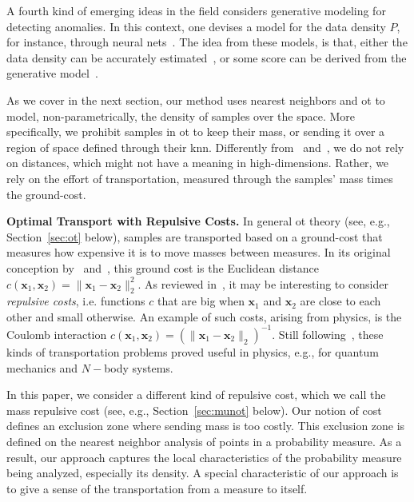 A fourth kind of emerging ideas in the field considers generative modeling for detecting anomalies. In this context, one devises a model for the data density $P$, for instance, through neural nets~\cite{goodfellow2014generative,kingma2013auto}. The idea from these models, is that, either the data density can be accurately estimated~\citep{dias2020anomaly}, or some score can be derived from the generative model~\citep{livernoche2023diffusion}.

As we cover in the next section, our method uses nearest neighbors and \gls{ot} to model, non-parametrically, the density of samples over the space. More specifically, we prohibit samples in \gls{ot} to keep their mass, or sending it over a region of space defined through their \gls{knn}. Differently from~\cite{ramaswamy2000efficient} and~\cite{breunig2000lof}, we do not rely on distances, which might not have a meaning in high-dimensions. Rather, we rely on the effort of transportation, measured through the samples' mass times the ground-cost.

\noindent\textbf{Optimal Transport with Repulsive Costs.} In general \gls{ot} theory (see, e.g., Section~\ref{sec:ot} below), samples are transported based on a ground-cost that measures how expensive it is to move masses between measures. In its original conception by~\cite{monge1781memoire} and~\cite{kantorovich1942transfer}, this ground cost is the Euclidean distance $c(\mathbf{x}_{1}, \mathbf{x}_{2}) = \lVert \mathbf{x}_{1} - \mathbf{x}_{2} \rVert_{2}^{2}$. As reviewed in~\cite{di2017optimal}, it may be interesting to consider \emph{repulsive costs}, i.e. functions $c$ that are big when $\mathbf{x}_{1}$ and $\mathbf{x}_{2}$ are close to each other and small otherwise. An example of such costs, arising from physics, is the Coulomb interaction $c(\mathbf{x}_{1}, \mathbf{x}_{2}) = (\lVert \mathbf{x}_{1} - \mathbf{x}_{2}\rVert_{2})^{-1}$. Still following~\cite{di2017optimal}, these kinds of transportation problems proved useful in physics, e.g., for quantum mechanics and $N-$body systems.

In this paper, we consider a different kind of repulsive cost, which we call the mass repulsive cost (see, e.g., Section~\ref{sec:munot} below). Our notion of cost defines an exclusion zone where sending mass is too costly. This exclusion zone is defined on the nearest neighbor analysis of points in a probability measure. As a result, our approach captures the local characteristics of the probability measure being analyzed, especially its density. A special characteristic of our approach is to give a sense of the transportation from a measure to itself.


